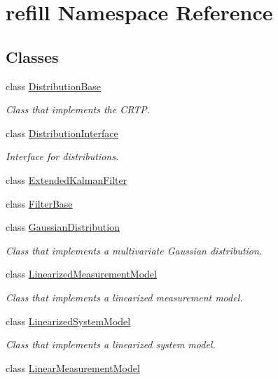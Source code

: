 \hypertarget{namespacerefill}{}\section{refill Namespace Reference}
\label{namespacerefill}
\subsection*{Classes}
\begin{DoxyCompactItemize}
\item 
class \hyperlink{classrefill_1_1DistributionBase}{Distribution\+Base}
\begin{DoxyCompactList}\small\item\em Class that implements the C\+R\+TP. \end{DoxyCompactList}\item 
class \hyperlink{classrefill_1_1DistributionInterface}{Distribution\+Interface}
\begin{DoxyCompactList}\small\item\em Interface for distributions. \end{DoxyCompactList}\item 
class \hyperlink{classrefill_1_1ExtendedKalmanFilter}{Extended\+Kalman\+Filter}
\item 
class \hyperlink{classrefill_1_1FilterBase}{Filter\+Base}
\item 
class \hyperlink{classrefill_1_1GaussianDistribution}{Gaussian\+Distribution}
\begin{DoxyCompactList}\small\item\em Class that implements a multivariate Gaussian distribution. \end{DoxyCompactList}\item 
class \hyperlink{classrefill_1_1LinearizedMeasurementModel}{Linearized\+Measurement\+Model}
\begin{DoxyCompactList}\small\item\em Class that implements a linearized measurement model. \end{DoxyCompactList}\item 
class \hyperlink{classrefill_1_1LinearizedSystemModel}{Linearized\+System\+Model}
\begin{DoxyCompactList}\small\item\em Class that implements a linearized system model. \end{DoxyCompactList}\item 
class \hyperlink{classrefill_1_1LinearMeasurementModel}{Linear\+Measurement\+Model}

\end{DoxyCompactItemize}
